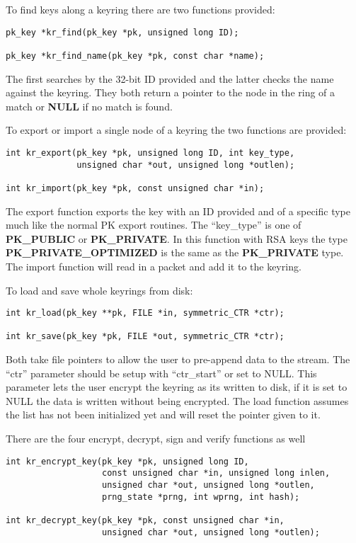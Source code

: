 \documentclass[b5paper]{book}
\begin{document}
To find keys along a keyring there are two functions provided:
\begin{verbatim}
pk_key *kr_find(pk_key *pk, unsigned long ID);

pk_key *kr_find_name(pk_key *pk, const char *name);
\end{verbatim}
The first searches by the 32-bit ID provided and the latter checks the name against the keyring.  They both return a pointer
to the node in the ring of a match or {\bf NULL} if no match is found.

To export or import a single node of a keyring the two functions are provided:
\begin{verbatim}
int kr_export(pk_key *pk, unsigned long ID, int key_type, 
              unsigned char *out, unsigned long *outlen);

int kr_import(pk_key *pk, const unsigned char *in);
\end{verbatim}
The export function exports the key with an ID provided and of a specific type much like the normal PK export routines.  The
``key\_type'' is one of {\bf PK\_PUBLIC} or {\bf PK\_PRIVATE}.  In this function with RSA keys the type 
{\bf PK\_PRIVATE\_OPTIMIZED} is the same as the {\bf PK\_PRIVATE} type.  The import function will read in a packet and 
add it to the keyring.  

To load and save whole keyrings from disk:
\begin{verbatim}
int kr_load(pk_key **pk, FILE *in, symmetric_CTR *ctr);

int kr_save(pk_key *pk, FILE *out, symmetric_CTR *ctr);
\end{verbatim}
Both take file pointers to allow the user to pre-append data to the stream.  The ``ctr'' parameter should be setup with 
``ctr\_start'' or set to NULL.  This parameter lets the user encrypt the keyring as its written to disk, if it is set
to NULL the data is written without being encrypted.  The load function assumes the list has not been initialized yet 
and will reset the pointer given to it.

There are the four encrypt, decrypt, sign and verify functions as well
\begin{verbatim}
int kr_encrypt_key(pk_key *pk, unsigned long ID, 
                   const unsigned char *in, unsigned long inlen,
                   unsigned char *out, unsigned long *outlen,
                   prng_state *prng, int wprng, int hash);

int kr_decrypt_key(pk_key *pk, const unsigned char *in,
                   unsigned char *out, unsigned long *outlen);
\end{verbatim}
\end{document}

